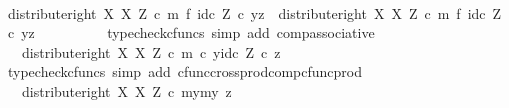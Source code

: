 \begin{isabellebody}
\ \ \ \ \isamarkupfalse%
\ {\isacharminus}{\kern0pt}\isanewline
\ \ \ \ \ \ \isamarkupfalse%
\ {\isachardoublequoteopen}{\isacharparenleft}{\kern0pt}distribute{\isacharunderscore}{\kern0pt}right\ X\ X\ Z\ {\isasymcirc}\isactrlsub c\ {\isacharparenleft}{\kern0pt}m\ {\isasymtimes}\isactrlsub f\ id\isactrlsub c\ Z{\isacharparenright}{\kern0pt}{\isacharparenright}{\kern0pt}\ {\isasymcirc}\isactrlsub c\ {\isasymlangle}y{\isacharprime}{\kern0pt}{\isacharcomma}{\kern0pt}z{\isasymrangle}\ {\isacharequal}{\kern0pt}\ distribute{\isacharunderscore}{\kern0pt}right\ X\ X\ Z\ {\isasymcirc}\isactrlsub c\ {\isacharparenleft}{\kern0pt}m\ {\isasymtimes}\isactrlsub f\ id\isactrlsub c\ Z{\isacharparenright}{\kern0pt}\ {\isasymcirc}\isactrlsub c\ {\isasymlangle}y{\isacharprime}{\kern0pt}{\isacharcomma}{\kern0pt}z{\isasymrangle}{\isachardoublequoteclose}\isanewline
\ \ \ \ \ \ \ \ \isamarkupfalse%
\ {\isacharparenleft}{\kern0pt}typecheck{\isacharunderscore}{\kern0pt}cfuncs{\isacharcomma}{\kern0pt}\ simp\ add{\isacharcolon}{\kern0pt}\ comp{\isacharunderscore}{\kern0pt}associative{}{\isacharparenright}{\kern0pt}\isanewline
\ \ \ \ \ \ \isamarkupfalse%
\ \isamarkupfalse%
\ {\isachardoublequoteopen}{\isachardot}{\kern0pt}{\isachardot}{\kern0pt}{\isachardot}{\kern0pt}\ {\isacharequal}{\kern0pt}\ distribute{\isacharunderscore}{\kern0pt}right\ X\ X\ Z\ {\isasymcirc}\isactrlsub c\ {\isasymlangle}m\ {\isasymcirc}\isactrlsub c\ y{\isacharprime}{\kern0pt}{\isacharcomma}{\kern0pt}id\isactrlsub c\ Z\ {\isasymcirc}\isactrlsub c\ z{\isasymrangle}{\isachardoublequoteclose}\isanewline
\ \ \ \ \ \ \ \ \isamarkupfalse%
\ {\isacharparenleft}{\kern0pt}typecheck{\isacharunderscore}{\kern0pt}cfuncs{\isacharcomma}{\kern0pt}\ simp\ add{\isacharcolon}{\kern0pt}\ cfunc{\isacharunderscore}{\kern0pt}cross{\isacharunderscore}{\kern0pt}prod{\isacharunderscore}{\kern0pt}comp{\isacharunderscore}{\kern0pt}cfunc{\isacharunderscore}{\kern0pt}prod{\isacharparenright}{\kern0pt}\isanewline
\ \ \ \ \ \ \isamarkupfalse%
\ \isamarkupfalse%
\ {\isachardoublequoteopen}{\isachardot}{\kern0pt}{\isachardot}{\kern0pt}{\isachardot}{\kern0pt}\ {\isacharequal}{\kern0pt}\ distribute{\isacharunderscore}{\kern0pt}right\ X\ X\ Z\ {\isasymcirc}\isactrlsub c\ {\isasymlangle}{\isasymlangle}my{}{\isacharcomma}{\kern0pt}my{}{\isasymrangle}{\isacharcomma}{\kern0pt}\ z{\isasymrangle}{\isachardoublequoteclose}\isanewline
\ \ \ \ \ \ \ \ \isamarkupfalse%

\end{isabellebody}
